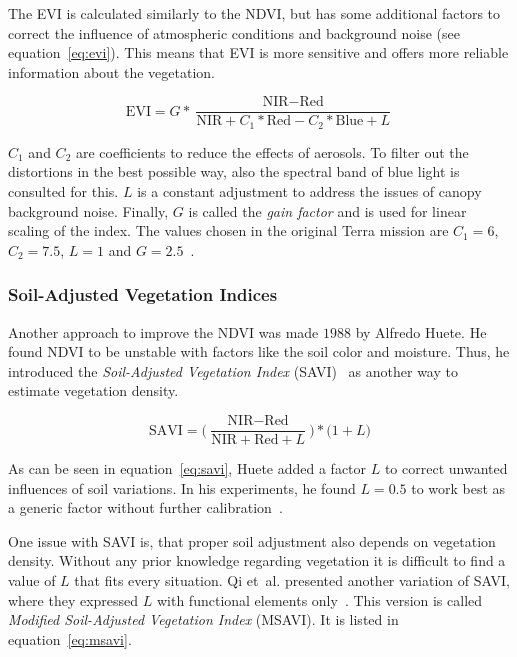 The EVI is calculated similarly to the NDVI, but has some additional factors to correct the influence of atmospheric conditions and background noise (see equation~\ref{eq:evi}). This means that EVI is more sensitive and offers more reliable information about the vegetation.

\begin{equation}
    \text{EVI} = G * \frac{
    \text{NIR}-\text{Red}
    }{
    \text{NIR} + C_1 * \text{Red} - C_2 * \text{Blue} + L
    }
    \label{eq:evi}
\end{equation}

$C_1$ and $C_2$ are coefficients to reduce the effects of aerosols. To filter out the distortions in the best possible way, also the spectral band of blue light is consulted for this. $L$ is a constant adjustment to address the issues of canopy background noise. Finally, $G$ is called the \emph{gain factor} and is used for linear scaling of the index. The values chosen in the original Terra mission are $C_1=6$, $C_2=7.5$, $L=1$ and $G=2.5$~\cite{modis2002}.

\subsubsection{Soil-Adjusted Vegetation Indices}
Another approach to improve the NDVI was made $1988$ by Alfredo Huete. He found NDVI to be unstable with factors like the soil color and moisture. Thus, he introduced the \emph{Soil-Adjusted Vegetation Index} (SAVI)~\cite{savi88} as another way to estimate vegetation density.

\begin{equation}
    \displaystyle
    \text{SAVI} =
    \bigg(
    \frac{\text{NIR} - \text{Red}}
    {\text{NIR} + \text{Red} + L}
    \bigg) * \big(1 + L \big)
    \label{eq:savi}
\end{equation}

As can be seen in equation~\ref{eq:savi}, Huete added a factor $L$ to correct unwanted influences of soil variations. In his experiments, he found $L=0.5$ to work best as a generic factor without further calibration~\cite{savi88}.

One issue with SAVI is, that proper soil adjustment also depends on vegetation density. Without any prior knowledge regarding vegetation it is difficult to find a value of $L$ that fits every situation. Qi et~al. presented another variation of SAVI, where they expressed $L$ with functional elements only~\cite{msavi94}. This version is called \emph{Modified Soil-Adjusted Vegetation Index} (MSAVI). It is listed in equation~\ref{eq:msavi}.

